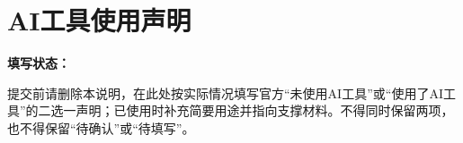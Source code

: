 \section*{AI工具使用声明}

\noindent\textbf{填写状态：}

\noindent 提交前请删除本说明，在此处按实际情况填写官方“未使用AI工具”或“使用了AI工具”的二选一声明；已使用时补充简要用途并指向支撑材料。不得同时保留两项，也不得保留“待确认”或“待填写”。

\noindent{}

